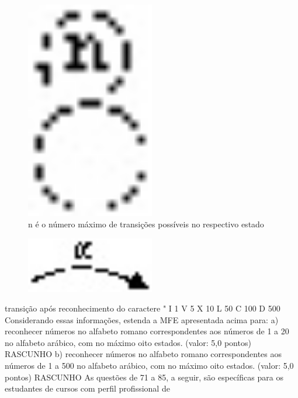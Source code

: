 \documentclass{exam}
\begin{document}
\begin{questions}
\begin{figure}[H]
	\begin{center}
		\includegraphics[width=0.5\textwidth]{CIENCIA_DA_COMPUTACAO_Prova2005-utf8_figuras/fig-0038.jpg}
		\caption{n é o número máximo de transições possíveis no respectivo estado}
	\end{center}
\end{figure}
\begin{figure}[H]
	\begin{center}
		\includegraphics[width=0.5\textwidth]{CIENCIA_DA_COMPUTACAO_Prova2005-utf8_figuras/fig-0039.jpg}
	\end{center}
\end{figure}
transição após reconhecimento do caractere "
I 1
V 5
X 10
L 50
C 100
D 500
Considerando essas informações, estenda a MFE apresentada acima para:
a) reconhecer números no alfabeto romano correspondentes aos números de 1 a 20 no alfabeto arábico, com no máximo oito estados.
(valor: 5,0 pontos)
RASCUNHO
b) reconhecer números no alfabeto romano correspondentes aos números de 1 a 500 no alfabeto arábico, com no máximo oito
estados. (valor: 5,0 pontos)
RASCUNHO
As questões de 71 a 85, a seguir, são específicas para os estudantes de cursos com perfil profissional de

\end{questions}
\end{document}
